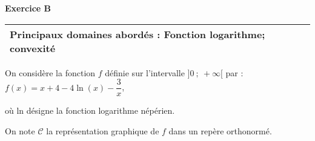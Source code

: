 \textbf{\large Exercice B}

\medskip

\begin{tabularx}{\linewidth}{|X|}\hline
\textbf{Principaux domaines abordés : Fonction logarithme; convexité}
\\ \hline
\end{tabularx}

\medskip

On considère la fonction $f$ définie sur l'intervalle $]0~;~ +\infty[$ par :
$f(x) = x + 4 - 4\ln (x) - \dfrac{3}{x}$,

où ln désigne la fonction logarithme népérien.

On note $\mathcal{C}$ la représentation graphique de $f$ dans un repère orthonormé.

\medskip

